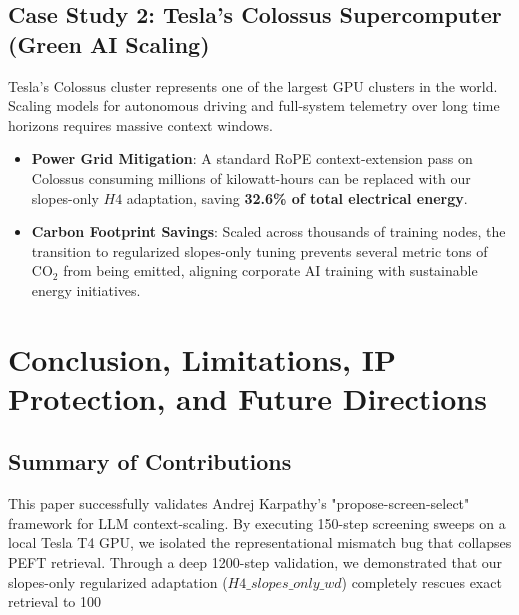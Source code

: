 \documentclass[11pt,journal,compsoc]{IEEEtran}
\begin{document}
\subsection{Case Study 2: Tesla's Colossus Supercomputer (Green AI Scaling)}
Tesla's Colossus cluster represents one of the largest GPU clusters in the world. Scaling models for autonomous driving and full-system telemetry over long time horizons requires massive context windows.
\begin{itemize}
    \item \textbf{Power Grid Mitigation}: A standard RoPE context-extension pass on Colossus consuming millions of kilowatt-hours can be replaced with our slopes-only $H4$ adaptation, saving \textbf{32.6\% of total electrical energy}.
    \item \textbf{Carbon Footprint Savings}: Scaled across thousands of training nodes, the transition to regularized slopes-only tuning prevents several metric tons of CO${}_2$ from being emitted, aligning corporate AI training with sustainable energy initiatives.
\end{itemize}

\section{Conclusion, Limitations, IP Protection, and Future Directions}
\label{sec:conclusion}

\subsection{Summary of Contributions}
This paper successfully validates Andrej Karpathy's "propose-screen-select" framework for LLM context-scaling. By executing 150-step screening sweeps on a local Tesla T4 GPU, we isolated the representational mismatch bug that collapses PEFT retrieval. Through a deep 1200-step validation, we demonstrated that our slopes-only regularized adaptation ($H4\_slopes\_only\_wd$) completely rescues exact retrieval to 100%
\end{document}
